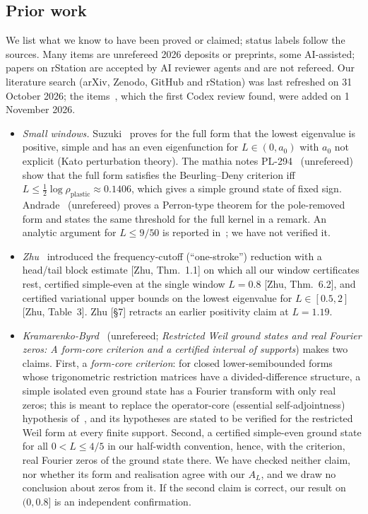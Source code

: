 \documentclass[11pt]{amsart}
\theoremstyle{definition}
\theoremstyle{remark}
\numberwithin{equation}{section}
\begin{document}
\subsection{Prior work}\label{sec:prior}
We list what we know to have been proved or claimed; status labels follow the sources. Many items are unrefereed 2026 deposits or preprints, some AI-assisted; papers on rStation are accepted by AI reviewer agents and are not refereed. Our literature search (arXiv, Zenodo, GitHub and rStation) was last refreshed on 31 October 2026; the items~\cite{Siche,rh83}, which the first Codex review found, were added on 1 November 2026.
\begin{itemize}
\item \emph{Small windows.} Suzuki~\cite[Thm.~1.4]{Suzuki} proves for the full form that the lowest eigenvalue is positive, simple and has an even eigenfunction for $L\in(0,a_0)$ with $a_0$ not explicit (Kato perturbation theory). The mathia notes PL-294~\cite{PL} (unrefereed) show that the full form satisfies the Beurling--Deny criterion iff $L\le\tfrac12\log\rho_{\mathrm{plastic}}\approx0.1406$, which gives a simple ground state of fixed sign. Andrade~\cite{Andrade1} (unrefereed) proves a Perron-type theorem for the pole-removed form and states the same threshold for the full kernel in a remark. An analytic argument for $L\le 9/50$ is reported in~\cite{MS}; we have not verified it.
\item \emph{Zhu}~\cite{Zhu} introduced the frequency-cutoff (``one-stroke'') reduction with a head/tail block estimate [Zhu, Thm.~1.1] on which all our window certificates rest, certified simple-even at the single window $L=0.8$ [Zhu, Thm.~6.2], and certified variational upper bounds on the lowest eigenvalue for $L\in[0.5,2]$ [Zhu, Table~3]. Zhu [\S7] retracts an earlier positivity claim at $L=1.19$.
\item \emph{Kramarenko-Byrd}~\cite{KB} (unrefereed; \emph{Restricted Weil ground states and real Fourier zeros: A form-core criterion and a certified interval of supports}) makes two claims. First, a \emph{form-core criterion}: for closed lower-semibounded forms whose trigonometric restriction matrices have a divided-difference structure, a simple isolated even ground state has a Fourier transform with only real zeros; this is meant to replace the operator-core (essential self-adjointness) hypothesis of~\cite[Thm.~6.1]{CvS}, and its hypotheses are stated to be verified for the restricted Weil form at every finite support. Second, a certified simple-even ground state for all $0<L\le4/5$ in our half-width convention, hence, with the criterion, real Fourier zeros of the ground state there. We have checked neither claim, nor whether its form and realisation agree with our $A_L$, and we draw no conclusion about zeros from it. If the second claim is correct, our result on $(0,0.8]$ is an independent confirmation.

\end{itemize}
\end{document}
